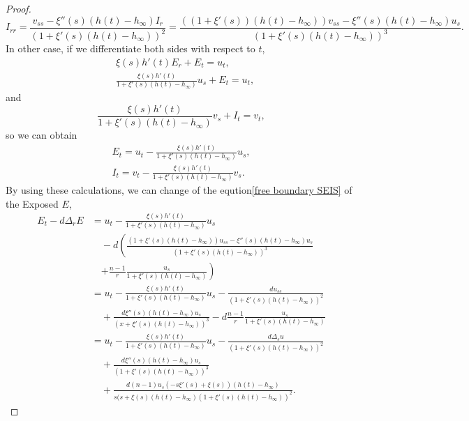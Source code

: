 \documentclass[11pt]{amsart}
\numberwithin{equation}{section}
\theoremstyle{plain}
\theoremstyle{definition}
\begin{document}
\begin{proof}
\begin{equation*}
	I_{rr}= \frac{v_{ss}-\xi''(s)(h(t)-h_\infty)I_r}{(1+\xi'(s)(h(t)-h_\infty))^2}=\frac{((1+\xi'(s))(h(t)-h_\infty))v_{ss}-\xi''(s)(h(t)-h_\infty)u_s}{(1+\xi'(s)(h(t)-h_\infty))^3}.
\end{equation*}
In other case, if we differentiate both sides with respect to $t$,
\begin{equation*}
	\begin{aligned}
		&\xi(s)h'(t)E_r+E_t=u_t,\\
		&\frac{\xi(s)h'(t)}{1+\xi'(s)(h(t)-h_\infty)}u_s+E_t=u_t,
	\end{aligned}
\end{equation*}
and
\begin{equation*}
	\frac{\xi(s)h'(t)}{1+\xi'(s)(h(t)-h_\infty)}v_s+I_t=v_t,
\end{equation*}
so we can obtain
\begin{equation*}
	\begin{aligned}
		E_t=u_t-\frac{\xi(s)h'(t)}{1+\xi'(s)(h(t)-h_\infty)}u_s,\\
		I_t=v_t-\frac{\xi(s)h'(t)}{1+\xi'(s)(h(t)-h_\infty)}v_s.
	\end{aligned}
\end{equation*}
By using these calculations, we can change of the eqution\cref{free boundary SEIS} of the Exposed $E$,
\begin{equation}\label{modified free boundary SEIS3}
	\begin{aligned}
		E_t-d\Delta_rE&=u_t-\frac{\xi(s)h'(t)}{1+\xi'(s)(h(t)-h_\infty)}u_s\\
		&\quad -d\left(\frac{(1+\xi'(s)(h(t)-h_\infty))u_{ss}-\xi''(s)(h(t)-h_\infty)u_s}{(1+\xi'(s)(h(t)-h_\infty))^3}\right.\\
		&\quad \left.+\frac{n-1}{r}\frac{u_s}{1+\xi'(s)(h(t)-h_\infty)}\right)\\
		&=u_t-\frac{\xi(s)h'(t)}{1+\xi'(s)(h(t)-h_\infty)}u_s-\frac{du_{ss}}{(1+\xi'(s)(h(t)-h_\infty))^2}\\
		&\quad +\frac{d\xi''(s)(h(t)-h_\infty)u_s}{(x+\xi'(s)(h(t)-h_\infty))^3}-d\frac{n-1}{r}\frac{u_s}{1+\xi'(s)(h(t)-h_\infty)}\\
		&=u_t-\frac{\xi(s)h'(t)}{1+\xi'(s)(h(t)-h_\infty)}u_s-\frac{d\Delta_s u}{(1+\xi'(s)(h(t)-h_\infty))^2}\\
		&\quad +\frac{d\xi''(s)(h(t)-h_\infty)u_s}{(1+\xi'(s)(h(t)-h_\infty))^3}\\
		&\quad +\frac{d(n-1)u_s(-s\xi'(s)+\xi(s))(h(t)-h_\infty)}{s(s+\xi(s)(h(t)-h_\infty)(1+\xi'(s)(h(t)-h_\infty))^2}.
	\end{aligned}

\end{equation}
\end{proof}
\end{document}
